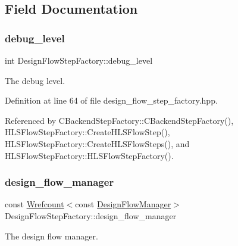 \subsection{Field Documentation}
\mbox{\label{classDesignFlowStepFactory_af40a2b630d65b0ec8e47248c16616253}} 
\subsubsection{\texorpdfstring{debug\+\_\+level}{debug\_level}}
{\footnotesize\ttfamily int Design\+Flow\+Step\+Factory\+::debug\+\_\+level\hspace{0.3cm}{\ttfamily [protected]}}



The debug level. 



Definition at line 64 of file design\+\_\+flow\+\_\+step\+\_\+factory.\+hpp.



Referenced by C\+Backend\+Step\+Factory\+::\+C\+Backend\+Step\+Factory(), H\+L\+S\+Flow\+Step\+Factory\+::\+Create\+H\+L\+S\+Flow\+Step(), H\+L\+S\+Flow\+Step\+Factory\+::\+Create\+H\+L\+S\+Flow\+Steps(), and H\+L\+S\+Flow\+Step\+Factory\+::\+H\+L\+S\+Flow\+Step\+Factory().

\mbox{\label{classDesignFlowStepFactory_ae7854875d87ed8d2fb4d82b2fa017b79}} 
\subsubsection{\texorpdfstring{design\+\_\+flow\+\_\+manager}{design\_flow\_manager}}
{\footnotesize\ttfamily const \hyperlink{classWrefcount}{Wrefcount}$<$const \hyperlink{classDesignFlowManager}{Design\+Flow\+Manager}$>$ Design\+Flow\+Step\+Factory\+::design\+\_\+flow\+\_\+manager\hspace{0.3cm}{\ttfamily [protected]}}



The design flow manager. 



